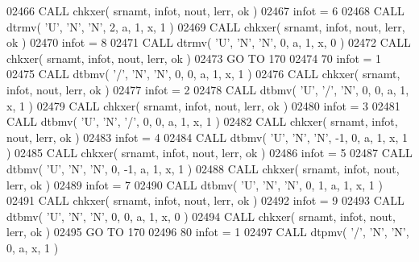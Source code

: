 \begin{DoxyCode}
02466       \textcolor{keyword}{CALL }chkxer( srnamt, infot, nout, lerr, ok )
02467       infot = 6
02468       \textcolor{keyword}{CALL }dtrmv( \textcolor{stringliteral}{'U'}, \textcolor{stringliteral}{'N'}, \textcolor{stringliteral}{'N'}, 2, a, 1, x, 1 )
02469       \textcolor{keyword}{CALL }chkxer( srnamt, infot, nout, lerr, ok )
02470       infot = 8
02471       \textcolor{keyword}{CALL }dtrmv( \textcolor{stringliteral}{'U'}, \textcolor{stringliteral}{'N'}, \textcolor{stringliteral}{'N'}, 0, a, 1, x, 0 )
02472       \textcolor{keyword}{CALL }chkxer( srnamt, infot, nout, lerr, ok )
02473       \textcolor{keywordflow}{GO TO} 170
02474    70 infot = 1
02475       \textcolor{keyword}{CALL }dtbmv( \textcolor{stringliteral}{'/'}, \textcolor{stringliteral}{'N'}, \textcolor{stringliteral}{'N'}, 0, 0, a, 1, x, 1 )
02476       \textcolor{keyword}{CALL }chkxer( srnamt, infot, nout, lerr, ok )
02477       infot = 2
02478       \textcolor{keyword}{CALL }dtbmv( \textcolor{stringliteral}{'U'}, \textcolor{stringliteral}{'/'}, \textcolor{stringliteral}{'N'}, 0, 0, a, 1, x, 1 )
02479       \textcolor{keyword}{CALL }chkxer( srnamt, infot, nout, lerr, ok )
02480       infot = 3
02481       \textcolor{keyword}{CALL }dtbmv( \textcolor{stringliteral}{'U'}, \textcolor{stringliteral}{'N'}, \textcolor{stringliteral}{'/'}, 0, 0, a, 1, x, 1 )
02482       \textcolor{keyword}{CALL }chkxer( srnamt, infot, nout, lerr, ok )
02483       infot = 4
02484       \textcolor{keyword}{CALL }dtbmv( \textcolor{stringliteral}{'U'}, \textcolor{stringliteral}{'N'}, \textcolor{stringliteral}{'N'}, -1, 0, a, 1, x, 1 )
02485       \textcolor{keyword}{CALL }chkxer( srnamt, infot, nout, lerr, ok )
02486       infot = 5
02487       \textcolor{keyword}{CALL }dtbmv( \textcolor{stringliteral}{'U'}, \textcolor{stringliteral}{'N'}, \textcolor{stringliteral}{'N'}, 0, -1, a, 1, x, 1 )
02488       \textcolor{keyword}{CALL }chkxer( srnamt, infot, nout, lerr, ok )
02489       infot = 7
02490       \textcolor{keyword}{CALL }dtbmv( \textcolor{stringliteral}{'U'}, \textcolor{stringliteral}{'N'}, \textcolor{stringliteral}{'N'}, 0, 1, a, 1, x, 1 )
02491       \textcolor{keyword}{CALL }chkxer( srnamt, infot, nout, lerr, ok )
02492       infot = 9
02493       \textcolor{keyword}{CALL }dtbmv( \textcolor{stringliteral}{'U'}, \textcolor{stringliteral}{'N'}, \textcolor{stringliteral}{'N'}, 0, 0, a, 1, x, 0 )
02494       \textcolor{keyword}{CALL }chkxer( srnamt, infot, nout, lerr, ok )
02495       \textcolor{keywordflow}{GO TO} 170
02496    80 infot = 1
02497       \textcolor{keyword}{CALL }dtpmv( \textcolor{stringliteral}{'/'}, \textcolor{stringliteral}{'N'}, \textcolor{stringliteral}{'N'}, 0, a, x, 1 )

\end{DoxyCode}
